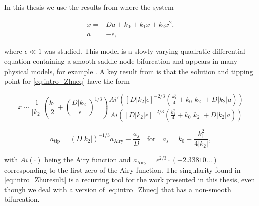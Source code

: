 \indent In this thesis we use the results from \cite{zhu2015tipping} where the system

\begin{equation}\label{eq:intro_Zhueq}
\begin{aligned}
\dot{x} =& Da + k_0 +k_1 x + k_2 x^2,\\
\dot{a} =& -\epsilon,
\end{aligned}
\end{equation}

where $\epsilon\ll 1$ was studied. This model is a slowly varying quadratic differential equation containing a smooth saddle-node bifurcation and appears in many physical models, for example \cite{erneux1989jump}. A key result from \cite{zhu2015tipping} is that the solution and tipping point for \eqref{eq:intro_Zhueq} have the form

\begin{equation}\label{eq:intro_Zhuairy}
x\sim \frac{1}{|k_2|}\left(\frac{k_1}{2}+\left(\frac{D|k_2|}{\epsilon}\right)^{1/3}\right)\frac{Ai'\left([D|k_2|\epsilon]^{-2/3}\left(\frac{k_1^2}{4}+k_0|k_2|+D|k_2|a\right)\right)}{Ai\left([D|k_2|\epsilon]^{-2/3}\left(\frac{k_1^2}{4}+k_0|k_2|+D|k_2|a\right)\right)}
\end{equation}

\begin{equation}\label{eq:intro_Zhuresult}
a_{\text{tip}}=(D|k_2|)^{-1/3}a_{\text{Airy}}-\frac{a_s}{D}\quad \text{for} \quad a_s = k_0+\frac{k_1^2}{4|k_2|},
\end{equation}

with $Ai(\cdot)$ being the Airy function and $a_{\text{Airy}}=\epsilon^{2/3}\cdot(-2.33810\ldots)$ corresponding to the first zero of the Airy function. The singularity found in \eqref{eq:intro_Zhuresult} is a recurring tool for the work presented in this thesis, even though we deal with a version of \eqref{eq:intro_Zhueq} that has a non-smooth bifurcation.

